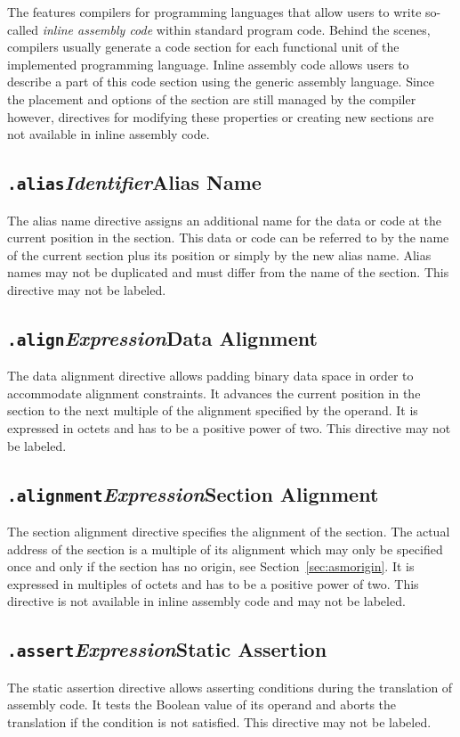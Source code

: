 The \ecs{} features compilers for programming languages that allow users to write so-called \emph{inline assembly code} within standard program code.
Behind the scenes, compilers usually generate a code section for each functional unit of the implemented programming language.
Inline assembly code allows users to describe a part of this code section using the generic assembly language.
Since the placement and options of the section are still managed by the compiler however, directives for modifying these properties or creating new sections are not available in inline assembly code.

\newcommand{\asmdirective}[4]{\subsection[#2]{\texttt{#1#2}\enskip\textnormal{\textit{#3}}\enskip\alignright#4}\label{sec:asm#2}}

\asmdirective{.}{alias}{Identifier}{Alias Name}

The alias name directive assigns an additional name for the data or code at the current position in the section.
This data or code can be referred to by the name of the current section plus its position or simply by the new alias name.
Alias names may not be duplicated and must differ from the name of the section.
This directive may not be labeled.

\asmdirective{.}{align}{Expression}{Data Alignment}

The data alignment directive allows padding binary data space in order to accommodate alignment constraints.
It advances the current position in the section to the next multiple of the alignment specified by the operand.
It is expressed in octets and has to be a positive power of two.
This directive may not be labeled.

\asmdirective{.}{alignment}{Expression}{Section Alignment}

The section alignment directive specifies the alignment of the section.
The actual address of the section is a multiple of its alignment which may only be specified once and only if the section has no origin, see Section~\ref{sec:asmorigin}.
It is expressed in multiples of octets and has to be a positive power of two.
This directive is not available in inline assembly code and may not be labeled.

\asmdirective{.}{assert}{Expression}{Static Assertion}

The static assertion directive allows asserting conditions during the translation of assembly code.
It tests the Boolean value of its operand and aborts the translation if the condition is not satisfied.
This directive may not be labeled.

